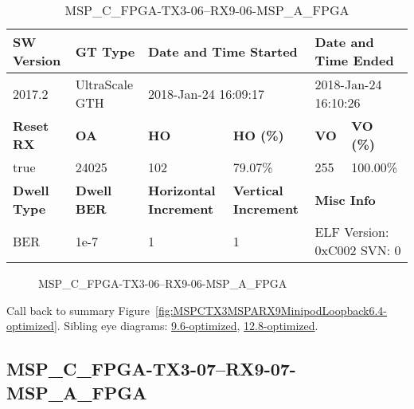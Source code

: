 \begin{table}[h]
\centering
\caption{MSP\_C\_FPGA-TX3-06--RX9-06-MSP\_A\_FPGA}
\label{tab:MSPCFPGATX306RX906MSPAFPGA6.4-optimized}
\begin{tabular}{@{}|l|l|l|l|l|l|@{}}
\toprule
\textbf{SW Version}                & \textbf{GT Type}   & \multicolumn{2}{l|}{\textbf{Date and Time Started}}            & \multicolumn{2}{l|}{\textbf{Date and Time Ended}}        \\ \midrule
2017.2                       & UltraScale GTH          & \multicolumn{2}{l|}{2018-Jan-24 16:09:17}                   & \multicolumn{2}{l|}{2018-Jan-24 16:10:26}               \\ \midrule
\textbf{Reset RX}                  & \textbf{OA} & \textbf{HO}   & \textbf{HO (\%)} & \textbf{VO} & \textbf{VO (\%)} \\ \midrule
true & 24025        & 102          & 79.07\%        & 255        & 100.00\%       \\ \midrule
\textbf{Dwell Type}                & \textbf{Dwell BER} & \textbf{Horizontal Increment} & \textbf{Vertical Increment}    & \multicolumn{2}{l|}{\textbf{Misc Info}}                  \\ \midrule
BER                            & 1e-7        & 1        & 1           & \multicolumn{2}{l|}{ELF Version: 0xC002 SVN: 0}                         \\ \bottomrule
\end{tabular}
\end{table}

\begin{figure}[h]
\caption{MSP\_C\_FPGA-TX3-06--RX9-06-MSP\_A\_FPGA} \label{fig:MSPCFPGATX306RX906MSPAFPGA6.4-optimized}
\end{figure}

Call back to summary Figure~\ref{fig:MSPCTX3MSPARX9MinipodLoopback6.4-optimized}.
Sibling eye diagrams: \hyperref[sec:MSPCFPGATX306RX906MSPAFPGA9.6-optimized]{9.6-optimized}, \hyperref[sec:MSPCFPGATX306RX906MSPAFPGA12.8-optimized]{12.8-optimized}.

\clearpage
\newpage


\subsection{MSP\_C\_FPGA-TX3-07--RX9-07-MSP\_A\_FPGA}\label{sec:MSPCFPGATX307RX907MSPAFPGA6.4-optimized}

